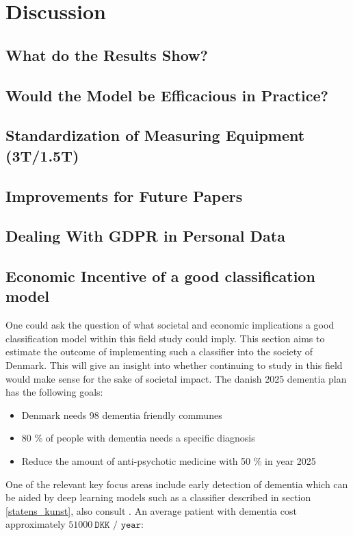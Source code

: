 \documentclass[12pt, fleqn, titlepage]{article}
\begin{document}
\section{Discussion}\label{discussion}

\subsection{What do the Results Show?}\label{discussionOfResults}

\subsection{Would the Model be Efficacious in Practice?}


\subsection{Standardization of Measuring Equipment (3T/1.5T)}

\subsection{Improvements for Future Papers}


\subsection{Dealing With GDPR in Personal Data}


\subsection{Economic Incentive of a good classification model}

One could ask the question of what societal and economic implications a good classification model within this field study could imply. This section aims to estimate the outcome of implementing such a classifier into the society of Denmark. This will give an insight into whether continuing to study in this field would make sense for the sake of societal impact. The danish 2025 dementia plan has the following goals:

\begin{itemize}
	\item Denmark needs 98 dementia friendly communes
	\item 80 \% of people with dementia needs a specific diagnosis 
	\item Reduce the amount of anti-psychotic medicine with 50 \% in year 2025
\end{itemize}
\noindent
One of the relevant key focus areas include early detection of dementia which can be aided by deep learning models such as a classifier described in section \ref{statens_kunst}, also consult \cite{yudong} \cite{suk_and_shen_1} \cite{suk_and_shen_2} \cite{cheng} \cite{neuro}. An average patient with dementia cost approximately $ 51000 \ \texttt{DKK / year}$:
\end{document}
